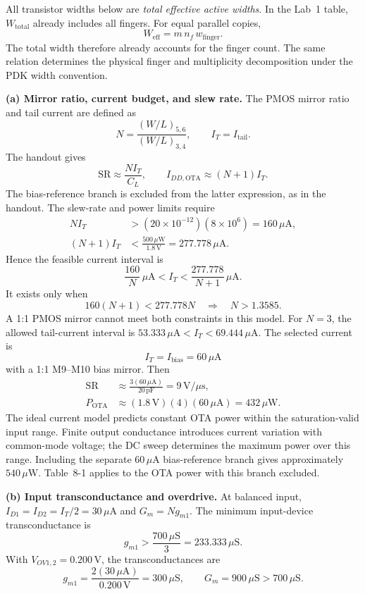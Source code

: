 \documentclass[12pt,letterpaper]{article}
\newcommand{\uA}{\,\mu\mathrm{A}}
\newcommand{\uS}{\,\mu\mathrm{S}}
\newcommand{\uW}{\,\mu\mathrm{W}}
\newcommand{\V}{\,\mathrm{V}}
\newcommand{\pF}{\,\mathrm{pF}}
\newcommand{\Vus}{\,\mathrm{V}/\mu\mathrm{s}}
\begin{document}
\begin{enumerate}
All transistor widths below are \emph{total effective active widths}.
In the Lab~1 table, $W_{\mathrm{total}}$ already includes all
fingers. For equal parallel copies,
\[
W_{\mathrm{eff}}=m\,n_f\,w_{\mathrm{finger}}.
\]
The total width therefore already accounts for the finger count.
The same relation determines the physical finger and multiplicity
decomposition under the PDK width convention.

\newpage
\textbf{(a) Mirror ratio, current budget, and slew rate.}
The PMOS mirror ratio and tail current are defined as
\[
N=\frac{(W/L)_{5,6}}{(W/L)_{3,4}},\qquad I_T=I_{\mathrm{tail}}.
\]
The handout gives
\[
\mathrm{SR}\approx\frac{NI_T}{C_L},\qquad
I_{DD,\mathrm{OTA}}\approx(N+1)I_T.
\]
The bias-reference branch is excluded from the latter expression,
as in the handout. The slew-rate and power limits require
\begin{align*}
NI_T&>(20\times10^{-12})(8\times10^6)=160\uA,\\
(N+1)I_T&<\frac{500\uW}{1.8\V}=277.778\uA.
\end{align*}
Hence the feasible current interval is
\[
\frac{160}{N}\uA<I_T<\frac{277.778}{N+1}\uA.
\]
It exists only when
\[
160(N+1)<277.778N\quad\Longrightarrow\quad N>1.3585.
\]
A 1:1 PMOS mirror cannot meet both constraints in this model.
For $\boxed{N=3}$, the allowed tail-current interval is
$53.333\uA<I_T<69.444\uA$. The selected current is
\[
\boxed{I_T=I_{\mathrm{bias}}=60\uA}
\]
with a 1:1 M9--M10 bias mirror. Then
\begin{align*}
\mathrm{SR}&\approx\frac{3(60\uA)}{20\pF}=\boxed{9\Vus},\\
P_{\mathrm{OTA}}&\approx(1.8\V)(4)(60\uA)=\boxed{432\uW}.
\end{align*}
The ideal current model predicts constant OTA power within the
saturation-valid input range. Finite output conductance introduces
current variation with common-mode voltage; the DC sweep determines
the maximum power over this range. Including the separate
$60\uA$ bias-reference branch gives approximately $540\uW$.
Table~8-1 applies to the OTA power with this branch excluded.

\textbf{(b) Input transconductance and overdrive.}
At balanced input, $I_{D1}=I_{D2}=I_T/2=30\uA$ and
$G_m=Ng_{m1}$. The minimum input-device transconductance is
\[
g_{m1}>\frac{700\uS}{3}=233.333\uS.
\]
With $V_{OV1,2}=0.200\V$, the transconductances are
\[
g_{m1}=\frac{2(30\uA)}{0.200\V}=300\uS,\qquad
\boxed{G_m=900\uS>700\uS.}
\]


\end{enumerate}
\end{document}
